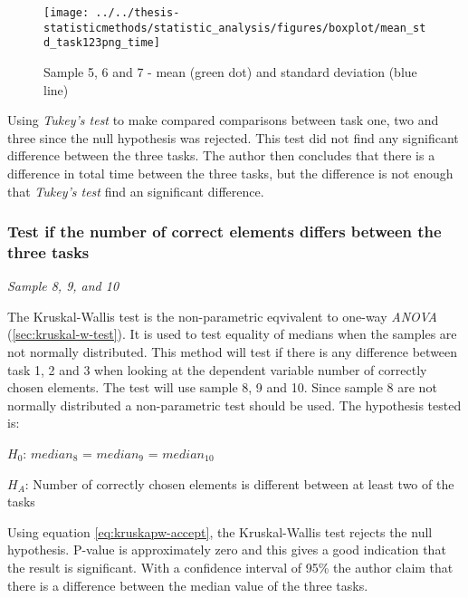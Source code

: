 \begin{figure}[h!]
	\centering
	\texttt{[image: ../../thesis-statisticmethods/statistic\_analysis/figures/boxplot/mean\_std\_task123png\_time]}
	\caption{Sample 5, 6 and 7 - mean (green dot) and standard deviation (blue line)}
	\label{fig:meanstdtask123pngtime}
\end{figure}

Using \textit{Tukey's test} to make compared comparisons between task one, two and three since the null hypothesis was rejected. This test did not find any significant difference between the three tasks. The author then concludes that there is a difference in total time between the three tasks, but the difference is not enough that \textit{Tukey's test} find an significant difference. 

\subsubsection[Sample 8, 9, and 10]{Test if the number of correct elements differs between the three tasks}\label{sec:sample_8_9_10_kruskal)} %
\textit{Sample 8, 9, and 10}\newline

The Kruskal-Wallis test is the non-parametric eqvivalent to one-way \textit{ANOVA} (\ref{sec:kruskal-w-test}). It is used to test equality of medians when the samples are not normally distributed. This method will test if there is any difference between task 1, 2 and 3 when looking at the dependent variable number of correctly chosen elements. The test will use sample 8, 9 and 10. Since sample 8 are not normally distributed a non-parametric test should be used. The hypothesis tested is: \\[0.2cm]

\centerline{$H_{0}$: $median_8$ = $median_9$ = $median_10$}
\centerline{$H_{A}$: Number of correctly chosen elements is different between at least two of the tasks}

Using equation \ref{eq:kruskapw-accept}, the Kruskal-Wallis test rejects the null hypothesis. P-value is approximately zero and this gives a good indication that the result is significant. With a confidence interval of 95\% the author claim that there is a difference between the median value of the three tasks. \\[0.2cm]

